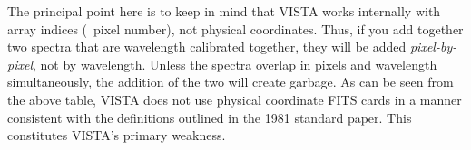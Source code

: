 The principal point here is to keep in mind that VISTA works internally with
array indices (\ie\ pixel number), not physical coordinates.  Thus, if you add
together two spectra that are wavelength calibrated together, they will be
added {\it pixel-by-pixel}, not by wavelength.  Unless the spectra overlap in
pixels and wavelength simultaneously, the addition of the two will create
garbage. As can be seen from the above table, VISTA does not use physical
coordinate FITS cards in a manner consistent with the definitions outlined in
the 1981 standard paper.  This constitutes VISTA's primary weakness.

%
